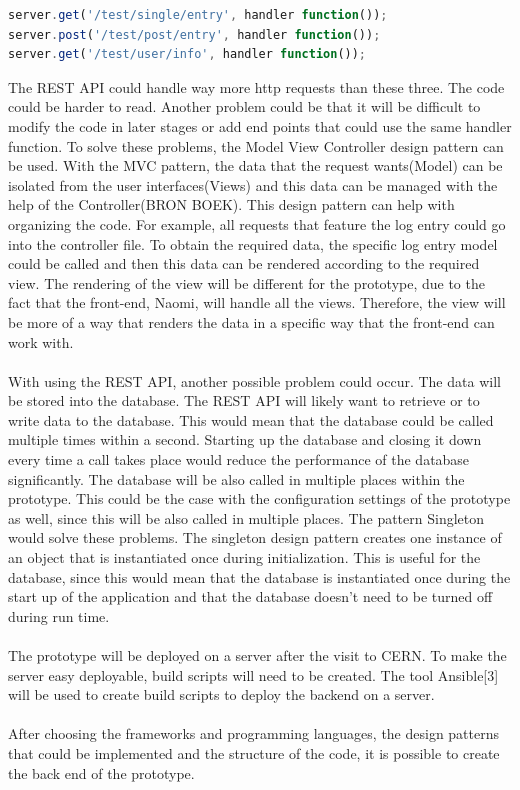 \documentclass[paper=a4, fontsize=11pt,twoside]{scrartcl}	%
\begin{document}
\begin{lstlisting}[language=JavaScript, frame=single]
server.get('/test/single/entry', handler function());
server.post('/test/post/entry', handler function());
server.get('/test/user/info', handler function());
\end{lstlisting} 
The REST API could handle way more http requests than these three. The code could be harder to read. Another problem could be that it will be difficult to modify the code in later stages or add end points that could use the same handler function. To solve these problems, the Model View Controller design pattern can be used. With the MVC pattern, the data that the request wants(Model) can be isolated from the user interfaces(Views) and this data can be managed with the help of the Controller(BRON BOEK). This design pattern can help with organizing the code. For example, all requests that feature the log entry could go into the controller file. To obtain the required data, the specific log entry model could be called and then this data can be rendered according to the required view. The rendering of the view will be different for the prototype, due to the fact that the front-end, Naomi, will handle all the views. Therefore, the view will be more of a way that renders the data in a specific way that the front-end can work with.\\ \\
With using the REST API, another possible problem could occur. The data will be stored into the database. The REST API will likely want to retrieve or to write data to the database. This would mean that the database could be called multiple times within a second. Starting up the database and closing it down every time a call takes place would reduce the performance of the database significantly. The database will be also called in multiple places within the prototype. This could be the case with the configuration settings of the prototype as well, since this will be also called in multiple places. The pattern Singleton would solve these problems. The singleton design pattern creates one instance of an object that is instantiated once during initialization. This is useful for the database, since this would mean that the database is instantiated once during the start up of the application and that the database doesn't need to be turned off during run time. \\ \\
The prototype will be deployed on a server after the visit to CERN. To make the server easy deployable, build scripts will need to be created. The tool Ansible[3] will be used to create build scripts to deploy the backend on a server. \\ \\
After choosing the frameworks and programming languages, the design patterns that could be implemented and the structure of the code, it is possible to create the back end of the prototype.   
\end{document}
